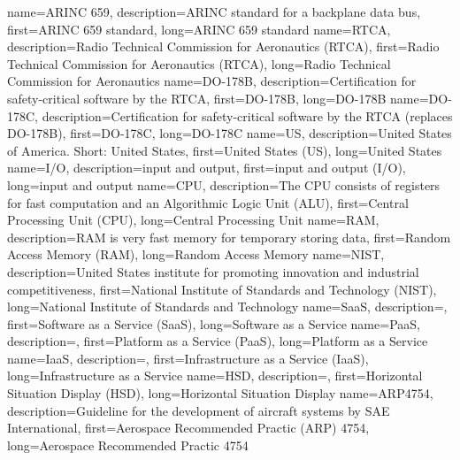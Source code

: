{%
    name={ARINC 659},
    description={ARINC standard for a backplane data bus},
    first={ARINC 659 standard},
    long={ARINC 659 standard}
}
{%
    name={RTCA},
    description={Radio Technical Commission for Aeronautics (RTCA)},
    first={Radio Technical Commission for Aeronautics (RTCA)},
    long={Radio Technical Commission for Aeronautics}
}
{%
    name={DO-178B},
    description={Certification for safety-critical software by the RTCA},
    first={DO-178B},
    long={DO-178B}
}
{%
    name={DO-178C},
    description={Certification for safety-critical software by the RTCA (replaces DO-178B)},
    first={DO-178C},
    long={DO-178C}
}
{%
    name={US},
    description={United States of America. Short: United States},
    first={United States (US)},
    long={United States}
}
{%
    name={I/O},
    description={input and output},
    first={input and output (I/O)},
    long={input and output}
}
{%
    name={CPU},
    description={The CPU consists of registers for fast computation and an Algorithmic Logic Unit (ALU)},
    first={Central Processing Unit (CPU)},
    long={Central Processing Unit}
}
{%
    name={RAM},
    description={RAM is very fast memory for temporary storing data},
    first={Random Access Memory (RAM)},
    long={Random Access Memory}
}
{%
    name={NIST},
    description={United States institute for promoting innovation and industrial competitiveness},
    first={National Institute of Standards and Technology (NIST)},
    long={National Institute of Standards and Technology}
}
{%
    name={SaaS},
    description={},
    first={Software as a Service (SaaS)},
    long={Software as a Service}
}
{%
    name={PaaS},
    description={},
    first={Platform as a Service (PaaS)},
    long={Platform as a Service}
}
{%
    name={IaaS},
    description={},
    first={Infrastructure as a Service (IaaS)},
    long={Infrastructure as a Service}
}
{%
    name={HSD},
    description={},
    first={Horizontal Situation Display (HSD)},
    long={Horizontal Situation Display}
}
{%
    name={ARP4754},
    description={Guideline for the development of aircraft systems by SAE International},
    first={Aerospace Recommended Practic (ARP) 4754},
    long={Aerospace Recommended Practic 4754}
}
